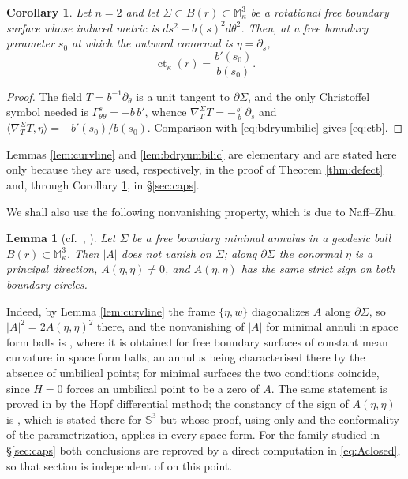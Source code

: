 \documentclass[11pt,a4paper]{amsart}
\theoremstyle{plain}
\newtheorem{lemma}[theorem]{Lemma}
\newtheorem{corollary}[theorem]{Corollary}
\theoremstyle{definition}
\newcommand{\M}{\mathbb{M}}
\newcommand{\Sph}{\mathbb{S}}
\newcommand{\ct}{\operatorname{ct}_\kappa}
\begin{document}
\begin{corollary}\label{cor:ctb}
Let $n=2$ and let $\Sigma\subset B(r)\subset\M^3_\kappa$ be a rotational free boundary surface whose induced metric is $ds^2+b(s)^2d\theta^2$. Then, at a free boundary parameter $s_0$ at which the outward conormal is $\eta=\partial_s$,
\begin{equation}\label{eq:ctb}
\ct(r)=\frac{b'(s_0)}{b(s_0)} .
\end{equation}
\end{corollary}

\begin{proof}
The field $T=b^{-1}\partial_\theta$ is a unit tangent to $\partial\Sigma$, and the only Christoffel symbol needed is $\Gamma^s_{\theta\theta}=-b\,b'$, whence $\nabla^\Sigma_TT=-\tfrac{b'}{b}\,\partial_s$ and $\langle\nabla^\Sigma_TT,\eta\rangle=-b'(s_0)/b(s_0)$. Comparison with \eqref{eq:bdryumbilic} gives \eqref{eq:ctb}.
\end{proof}

Lemmas \ref{lem:curvline} and \ref{lem:bdryumbilic} are elementary and are stated here only because they are used, respectively, in the proof of Theorem \ref{thm:defect} and, through Corollary \ref{cor:ctb}, in \S\ref{sec:caps}.

We shall also use the following nonvanishing property, which is due to Naff--Zhu.

\begin{lemma}[{cf.\ \cite[Cor.~4.4]{Santos}, \cite[Prop.~4.1 and Cor.~4.2]{NZ1}}]\label{lem:bdrycurv}
Let $\Sigma$ be a free boundary minimal annulus in a geodesic ball $B(r)\subset\M^3_\kappa$. Then $|A|$ does not vanish on $\Sigma$; along $\partial\Sigma$ the conormal $\eta$ is a principal direction, $A(\eta,\eta)\neq 0$, and $A(\eta,\eta)$ has the same strict sign on both boundary circles.
\end{lemma}

Indeed, by Lemma \ref{lem:curvline} the frame $\{\eta,w\}$ diagonalizes $A$ along $\partial\Sigma$, so $|A|^2=2A(\eta,\eta)^2$ there, and the nonvanishing of $|A|$ for minimal annuli in space form balls is \cite[Cor.~4.4]{Santos}, where it is obtained for free boundary surfaces of constant mean curvature in space form balls, an annulus being characterised there by the absence of umbilical points; for minimal surfaces the two conditions coincide, since $H=0$ forces an umbilical point to be a zero of $A$. The same statement is proved in \cite[Prop.~4.1]{NZ1} by the Hopf differential method; the constancy of the sign of $A(\eta,\eta)$ is \cite[Cor. 4.2]{NZ1}, which is stated there for $\Sph^3$ but whose proof, using only \cite[Prop. 4.1]{NZ1} and the conformality of the parametrization, applies in every space form. For the family studied in \S\ref{sec:caps} both conclusions are reproved by a direct computation in \eqref{eq:Aclosed}, so that section is independent of \cite{NZ1} on this point.
\end{document}

